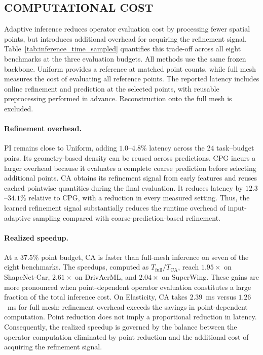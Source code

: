 \subsection{COMPUTATIONAL COST}
\label{app:computational_cost}

Adaptive inference reduces operator evaluation cost by processing fewer
spatial points, but introduces additional overhead for acquiring the
refinement signal. Table~\ref{tab:inference_time_sampled}
quantifies this trade-off across all eight benchmarks at the three
evaluation budgets. All methods use the same frozen backbone. Uniform
provides a reference at matched point counts, while full mesh measures the
cost of evaluating all reference points. The reported latency includes
online refinement and prediction at the selected points, with reusable
preprocessing performed in advance. Reconstruction onto the full mesh is
excluded.



\paragraph{Refinement overhead.}
PI remains close to Uniform, adding $1.0$--$4.8\%$ latency across the
24 task--budget pairs. Its geometry-based density can be reused across
predictions. CPG incurs a larger overhead because it evaluates a complete
coarse prediction before selecting additional points. CA obtains its
refinement signal from early features and reuses cached pointwise
quantities during the final evaluation. It reduces latency by
$12.3$--$34.1\%$ relative to CPG, with a reduction in every measured
setting. Thus, the learned refinement signal substantially reduces the
runtime overhead of input-adaptive sampling compared with
coarse-prediction-based refinement.

\paragraph{Realized speedup.}
At a $37.5\%$ point budget, CA is faster than full-mesh inference on seven
of the eight benchmarks. The speedups, computed as
$T_{\mathrm{full}}/T_{\mathrm{CA}}$, reach $1.95\times$ on ShapeNet-Car,
$2.61\times$ on DrivAerML, and $2.04\times$ on SuperWing.
These gains are more pronounced when
point-dependent operator evaluation constitutes a large fraction of the
total inference cost. On Elasticity, CA takes $2.39$~ms versus $1.26$~ms
for full mesh: refinement overhead exceeds the savings in point-dependent
computation.
Point reduction does not imply a proportional reduction in latency.
Consequently, the realized speedup is governed by the balance between the
operator computation eliminated by point reduction and the additional
cost of acquiring the refinement signal.

